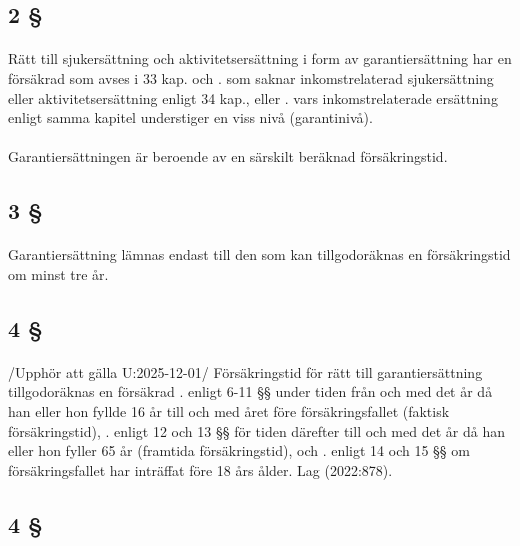 \documentclass[a4paper,notitlepage,openany,10pt]{book}
\begin{document}
\subsection*{2 §}
\paragraph*{}
Rätt till sjukersättning och aktivitetsersättning i form av garantiersättning har en försäkrad som avses i 33 kap. och
. som saknar inkomstrelaterad sjukersättning eller aktivitetsersättning enligt 34 kap., eller
. vars inkomstrelaterade ersättning enligt samma kapitel understiger en viss nivå (garantinivå).
\paragraph*{}
Garantiersättningen är beroende av en särskilt beräknad försäkringstid.
\subsection*{3 §}
\paragraph*{}
Garantiersättning lämnas endast till den som kan tillgodoräknas en försäkringstid om minst tre år.
\subsection*{4 §}
\paragraph*{}
/Upphör att gälla U:2025-12-01/
Försäkringstid för rätt till garantiersättning tillgodoräknas en försäkrad
. enligt 6-11 §§ under tiden från och med det år då han eller hon fyllde 16 år till och med året före försäkringsfallet (faktisk försäkringstid),
. enligt 12 och 13 §§ för tiden därefter till och med det år då han eller hon fyller 65 år (framtida försäkringstid), och
. enligt 14 och 15 §§ om försäkringsfallet har inträffat före 18 års ålder.
Lag (2022:878).
\subsection*{4 §}
\end{document}
